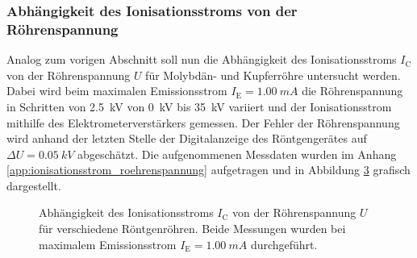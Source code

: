 \documentclass[11pt, a4paper]{article}
\numberwithin{equation}{section}
\begin{document}
\subsubsection{Abhängigkeit des Ionisationsstroms von der Röhrenspannung}
\label{sec:abh_roehrenspannung}
Analog zum vorigen Abschnitt soll nun die Abhängigkeit des Ionisationsstroms $I_\mathrm{C}$ von der Röhrenspannung $U$ für Molybdän- und Kupferröhre untersucht werden.
Dabei wird beim maximalen Emissionsstrom $I_\mathrm{E} = \SI{1.00}{mA}$ die Röhrenspannung in Schritten von \SI{2.5}{kV} von \SI{0}{kV} bis \SI{35}{kV} variiert und der Ionisationsstrom mithilfe des Elektrometerverstärkers gemessen.
Der Fehler der Röhrenspannung wird anhand der letzten Stelle der Digitalanzeige des Röntgengerätes auf $\Delta U = \SI{0.05}{kV}$ abgeschätzt.
Die aufgenommenen Messdaten wurden im Anhang \ref{app:ionisationsstrom_roehrenspannung} aufgetragen und in Abbildung \ref{fig:abh_roehrenspannung} grafisch dargestellt.
\begin{figure}[hp]
	\vspace{-10mm}
	
	\begin{subfigure}[b]{1\textwidth}
		\centering
		
		\label{fig:mo_roehrenspannung}
	\end{subfigure}
	
	\vspace{2.5mm}
	
	\begin{subfigure}[b]{1\textwidth}
		\centering
		
		\label{fig:cu_roehrenspannung}
	\end{subfigure}
	\caption{Abhängigkeit des Ionisationsstroms $I_\mathrm{C}$ von der Röhrenspannung $U$ für verschiedene Röntgenröhren. Beide Messungen wurden bei maximalem Emissionsstrom $I_\mathrm{E} = \SI{1.00}{mA}$ durchgeführt.}
	\label{fig:abh_roehrenspannung}
\end{figure}
\end{document}
